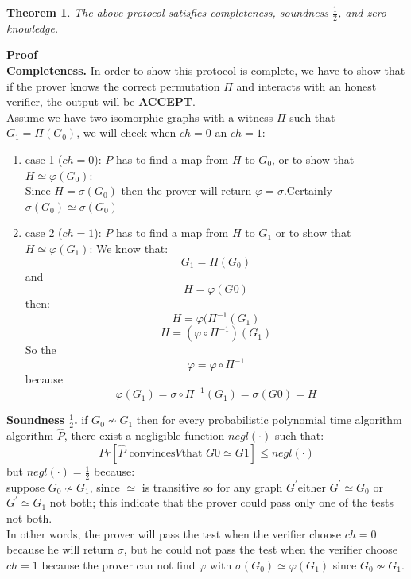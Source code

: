 \documentclass[12pt,a4paper]{article}
\newtheorem{thm}{Theorem}
\begin{document}
\begin{thm}\cite{lec-notes1:3}
The above protocol satisfies completeness, soundness $\frac{1}{2}$, and zero-knowledge.	
\end{thm}
\textbf{Proof}\\
\textbf{Completeness.}
In order to show this protocol is complete, we have to show that if the prover knows the correct permutation $\Pi$ and interacts with an honest verifier, the output will be \textbf{ACCEPT}.\\
Assume we have two isomorphic graphs with a witness $\Pi$ such that $G_1=\Pi(G_0)$, we will check when $ch=0$ an $ch=1$:\\
\begin{enumerate}	
\item
\begin{enumerate}
case 1 ($ch=0$): $P$ has to find a map from $H$ to $G_0$, or to show that $H\simeq \varphi(G_0)$:\\
Since $H=\sigma(G_0)$ then the prover will return $\varphi = \sigma $.Certainly $\sigma(G_0)\simeq \sigma(G_0) $
\end{enumerate}
	\item
	\begin{enumerate}
case 2 ($ch=1$): $P$ has to find a map from $H$ to $G_1$ or to show that $H\simeq \varphi(G_1)$:
		We know that: $$G_1=\Pi(G_0)$$ and $$H=\varphi(G0)$$ then:\\
		$$H=\varphi(\Pi^{-1}(G_1)$$
		$$H=(\varphi \circ 
		\Pi^{-1})(G_1)$$
		So the $$\varphi=\varphi \circ \Pi^{-1}$$
because $$\varphi(G_1)=\sigma \circ \Pi^{-1}(G_1)=\sigma(G0)=H$$
	\end{enumerate}
\end{enumerate}
\textbf{Soundness $\frac{1}{2}$.}
if $G_0\nsim G_1$ then for every probabilistic polynomial time algorithm algorithm $\hat{P}$, there exist a negligible function $negl(\cdot)$ such that:\\
$$Pr[\hat{P}\text{ convinces} V \text{that }G0\simeq G1]\leq negl(\cdot)$$
but $negl(\cdot)=\frac{1}{2}$ because:\\
suppose $G_0\nsim G_1$, since $\simeq$ is transitive so for any graph ${G}^{'}$either ${G}^{'}\simeq G_0$ or ${G}^{'}\simeq G_1$ not both; this indicate that the prover could pass only one of the tests not both.\\
In other words, the prover will pass the test when the verifier choose $ch=0$ because he will return $\sigma$, but he could not pass the test when the verifier choose $ch=1$ because the prover can not find $\varphi$ with $\sigma(G_0)\simeq \varphi(G_1)$ since $G_0\nsim G_1$.\\
\end{document}
